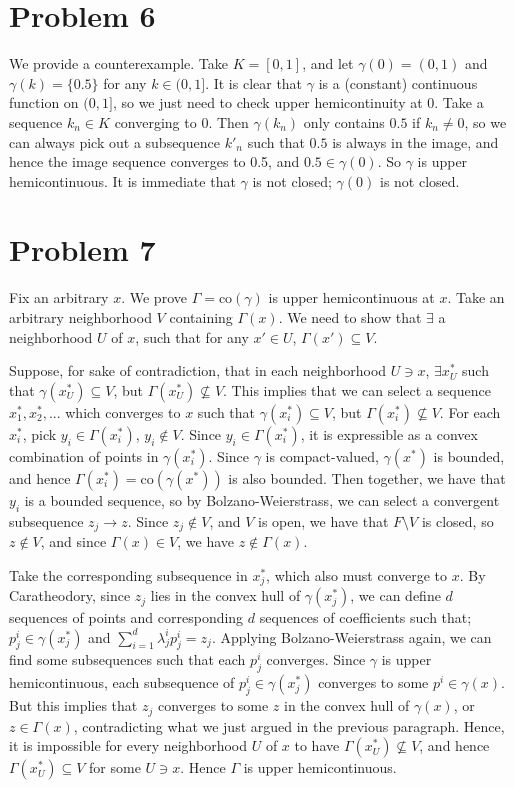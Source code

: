 \documentclass[10pt,letter]{article}
\begin{document}
\section*{Problem 6}
We provide a counterexample. Take $K = [0,1]$, and let $\gamma(0) = (0,1)$ and $\gamma(k) = \{ 0.5 \} $ for any $k \in (0, 1]$. It is clear that $\gamma$ is a (constant) continuous function on $(0,1]$, so we just need to check upper hemicontinuity at 0. Take a sequence $k_n \in K$ converging to 0. Then $\gamma(k_n)$ only contains $0.5$ if $k_n \neq 0$, so we can always pick out a subsequence $k'_n$ such that $0.5$ is always in the image, and hence the image sequence converges to 0.5, and $0.5 \in \gamma(0)$. So $\gamma$ is upper hemicontinuous. It is immediate that $\gamma$ is not closed; $\gamma(0)$ is not closed.
\section*{Problem 7}
Fix an arbitrary $x$. We prove $\Gamma = \text{co} (\gamma)$ is upper hemicontinuous at $x$. Take an arbitrary neighborhood $V$ containing $\Gamma(x)$.  We need to show that $\exists$ a neighborhood $U$ of $x$, such that for any $x' \in U$, $\Gamma(x') \subseteq V$.

Suppose, for sake of contradiction, that in each neighborhood $U \ni x$, $\exists x^*_U$ such that $\gamma(x^*_U) \subseteq V$, but $\Gamma(x^*_U) \not \subseteq V$. This implies that we can select a sequence $x^*_1, x^*_2, ...$ which converges to $x$ such that $\gamma(x^*_i) \subseteq V$, but $\Gamma(x^*_i) \not \subseteq V$. For each $x^*_i$, pick $y_i \in \Gamma(x^*_i)$, $y_i \not \in V$. Since $y_i \in \Gamma(x^*_i)$, it is expressible as a convex combination of points in $\gamma(x^*_i)$.
Since $\gamma$ is compact-valued, $\gamma(x^*)$ is bounded, and hence $\Gamma(x^*_i) = \text{co} (\gamma(x^*))$ is also bounded. Then together, we have that $y_i$ is a bounded sequence, so by Bolzano-Weierstrass, we can select a convergent subsequence $z_j \to z$. Since $z_j \not\in V$, and $V$ is open, we have that $F \setminus V$ is closed, so $z \not \in V$, and since $\Gamma(x) \in V$, we have $z \not \in \Gamma(x)$.

Take the corresponding subsequence in $x^*_j$, which also must converge to $x$. By Caratheodory, since $z_j$ lies in the convex hull of $\gamma(x^*_j)$, we can define $d$ sequences of points and corresponding $d$ sequences of coefficients such that; $p^i_j \in \gamma(x^*_j)$ and $\sum_{i = 1}^d \lambda^i_j p^i_j = z_j$. Applying Bolzano-Weierstrass again, we can find some subsequences such that each $p^i_j$ converges. Since $\gamma$ is upper hemicontinuous, each subsequence of $p^i_j \in \gamma(x^*_j)$ converges to some $p^i \in \gamma(x)$. But this implies that $z_j$ converges to some $z$ in the convex hull of $\gamma(x)$, or $z \in \Gamma(x)$, contradicting what we just argued in the previous paragraph. Hence, it is impossible for every neighborhood $U$ of $x$ to have $\Gamma(x^*_U) \not \subseteq V$, and hence $\Gamma(x^*_U) \subseteq V$ for some $U \ni x$. Hence $\Gamma$ is upper hemicontinuous.
\end{document}
